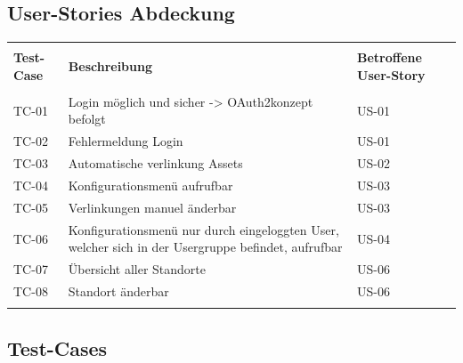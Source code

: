 \subsection{User-Stories Abdeckung}
\begin{table}[H]
  \begin{tabularx}{\textwidth}{l X l}\hline \\
  \textbf{Test-Case} & \textbf{Beschreibung} & \textbf{Betroffene User-Story} \\\hline \\
  TC-01 & Login möglich und sicher -> OAuth2konzept befolgt & US-01 \\
  TC-02 & Fehlermeldung Login & US-01 \\
  TC-03 & Automatische verlinkung Assets & US-02 \\
  TC-04 & Konfigurationsmenü aufrufbar & US-03 \\
  TC-05 & Verlinkungen manuel änderbar & US-03 \\
  TC-06 & Konfigurationsmenü nur durch eingeloggten User, welcher sich in der Usergruppe befindet, aufrufbar & US-04 \\
  TC-07 & Übersicht aller Standorte & US-06 \\
  TC-08 & Standort änderbar & US-06 \\
  \\\hline
  \end{tabularx}
\end{table}
\pagebreak
\subsection{Test-Cases}
